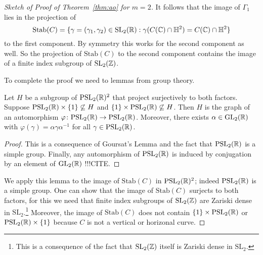 \begin{proof}[Sketch of Proof of Theorem~\ref{thm:ao} for $m=2$]
  It follows that the image of
  $\Gamma_1$ lies in the projection of
  \begin{equation*}
    \mathrm{Stab}(C) = \{\gamma= (\gamma_1,\gamma_2) \in \mathrm{SL}_2({\mathbb{R}}) :
    \gamma (C({\mathbb{C}})\cap{\mathbb{H}}^2) =  C({\mathbb{C}})\cap{\mathbb{H}}^2 \}
  \end{equation*}
  to the first component. 
  By symmetry this works for the second component as well. So the
  projection of $\mathrm{Stab}(C)$ to the second component contains 
  the image of a finite index subgroup of $\mathrm{SL}_2({\mathbb{Z}})$.
  
  To complete the proof we need to lemmas from group theory.
  
  \begin{lemma}
    Let $H$ be a subgroup of $\mathrm{PSL}_2({\mathbb{R}})^2$ that
    project surjectively to both factors. Suppose
    $\mathrm{PSL}_2({\mathbb{R}})\times\{1\}\not\subseteq H$
    and $\{1\}\times \mathrm{PSL}_2({\mathbb{R}})\not\subseteq H$. Then
    $H$ is the graph of an automorphism
    $\varphi\colon \mathrm{PSL}_2({\mathbb{R}})\rightarrow \mathrm{PSL}_2({\mathbb{R}})$. Moreover,
    there exists $\alpha\in \mathrm{GL}_2({\mathbb{R}})$ with
    $\varphi(\gamma) = \alpha\gamma\alpha^{-1}$ for all
    $\gamma\in\mathrm{PSL}_2({\mathbb{R}})$.
  \end{lemma}
  \begin{proof}
    This is a consequence of Goursat's Lemma and the fact that
    $\mathrm{PSL}_2({\mathbb{R}})$ is a simple group. Finally, any automorphism of
    $\mathrm{PSL}_2({\mathbb{R}})$ is induced by conjugation by an element of
    $\mathrm{GL}_2({\mathbb{R}})$ !!!CITE.
  \end{proof}

  We apply this lemma to the image of $\mathrm{Stab}(C)$ in
  $\mathrm{PSL}_2({\mathbb{R}})^2$; indeed
  $\mathrm{PSL}_2({\mathbb{R}})$ is
  a simple group.
  One can show that the image of $\mathrm{Stab}(C)$ surjects to both factors, for
  this we need that finite index subgroups of $\mathrm{SL}_2({\mathbb{Z}})$ are
  Zariski dense in $\mathrm{SL}_2$.\footnote{This is a
    consequence of the fact that $\mathrm{SL}_2({\mathbb{Z}})$ itself is
    Zariski dense in $\mathrm{SL}_2$.}
  Moreover, the image of $\mathrm{Stab}(C)$ does not contain $\{1\}\times
  \mathrm{PSL}_2({\mathbb{R}})$ or  $\mathrm{PSL}_2({\mathbb{R}}) \times\{1\}$ because $C$
  is not a  vertical or horizonal curve. 


\end{proof}
